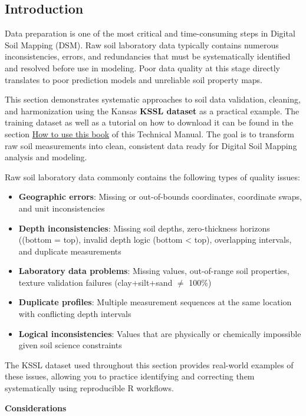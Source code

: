 \documentclass[
  10pt,
  b5paper,
  oneside]{book}
\begin{document}
\subsection{Introduction}\label{introduction}

Data preparation is one of the most critical and time-consuming steps in Digital Soil Mapping (DSM). Raw soil laboratory data typically contains numerous inconsistencies, errors, and redundancies that must be systematically identified and resolved before use in modeling. Poor data quality at this stage directly translates to poor prediction models and unreliable soil property maps.

This section demonstrates systematic approaches to soil data validation, cleaning, and harmonization using the Kansas \textbf{KSSL dataset} as a practical example. The training dataset as well as a tutorial on how to download it can be found in the section \hyperref[how-to-use]{How to use this book} of this Technical Manual. The goal is to transform raw soil measurements into clean, consistent data ready for Digital Soil Mapping analysis and modeling.

Raw soil laboratory data commonly contains the following types of quality issues:

\begin{itemize}
\item
  \textbf{Geographic errors}: Missing or out-of-bounds coordinates, coordinate swaps, and unit inconsistencies
\item
  \textbf{Depth inconsistencies}: Missing soil depths, zero-thickness horizons ((bottom = top), invalid depth logic (bottom \textless{} top), overlapping intervals, and duplicate measurements
\item
  \textbf{Laboratory data problems}: Missing values, out-of-range soil properties, texture validation failures (clay+silt+sand \(\neq\) 100\%)
\item
  \textbf{Duplicate profiles}: Multiple measurement sequences at the same location with conflicting depth intervals
\item
  \textbf{Logical inconsistencies}: Values that are physically or chemically impossible given soil science constraints
\end{itemize}

The KSSL dataset used throughout this section provides real-world examples of these issues, allowing you to practice identifying and correcting them systematically using reproducible R workflows.

\textbf{Considerations}
\end{document}
